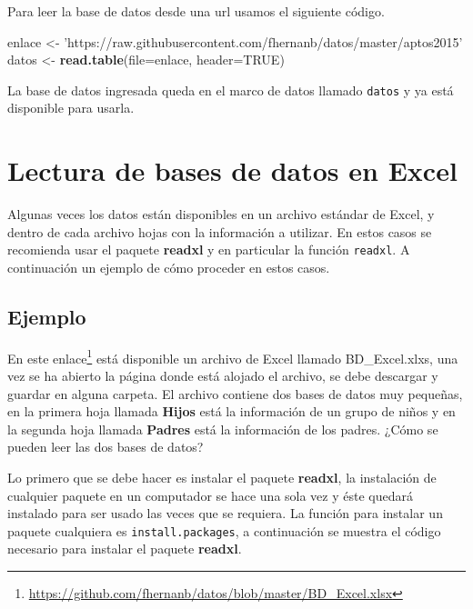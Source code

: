 \documentclass[10pt,]{krantz}
\makeatletter
\newenvironment{Shaded}{\begin{snugshade}}{\end{snugshade}}
\newcommand{\KeywordTok}[1]{\textcolor[rgb]{0.13,0.29,0.53}{\textbf{{#1}}}}
\newcommand{\DataTypeTok}[1]{\textcolor[rgb]{0.13,0.29,0.53}{{#1}}}
\newcommand{\StringTok}[1]{\textcolor[rgb]{0.31,0.60,0.02}{{#1}}}
\newcommand{\OtherTok}[1]{\textcolor[rgb]{0.56,0.35,0.01}{{#1}}}
\newcommand{\NormalTok}[1]{{#1}}
\renewcommand{\href}[2]{#2\footnote{\url{#1}}}
\newenvironment{kframe}{%
\medskip{}
\setlength{\fboxsep}{.8em}
 \def\at@end@of@kframe{}%
 \ifinner\ifhmode%
  \def\at@end@of@kframe{\end{minipage}}%
  \begin{minipage}{\columnwidth}%
 \fi\fi%
 \def\FrameCommand##1{\hskip\@totalleftmargin \hskip-\fboxsep
 \colorbox{shadecolor}{##1}\hskip-\fboxsep
     \hskip-\linewidth \hskip-\@totalleftmargin \hskip\columnwidth}%
 \MakeFramed {\advance\hsize-\width
   \@totalleftmargin\z@ \linewidth\hsize
   \@setminipage}}%
 {\par\unskip\endMakeFramed%
 \at@end@of@kframe}
\renewenvironment{Shaded}{\begin{kframe}}{\end{kframe}}
\makeatother
\begin{document}
Para leer la base de datos desde una url usamos el siguiente código.

\begin{Shaded}
\begin{Highlighting}[]
\NormalTok{enlace <-}\StringTok{ 'https://raw.githubusercontent.com/fhernanb/datos/master/aptos2015'}
\NormalTok{datos <-}\StringTok{ }\KeywordTok{read.table}\NormalTok{(}\DataTypeTok{file=}\NormalTok{enlace, }\DataTypeTok{header=}\OtherTok{TRUE}\NormalTok{)}
\end{Highlighting}
\end{Shaded}

La base de datos ingresada queda en el marco de datos llamado
\texttt{datos} y ya está disponible para usarla.

\section{Lectura de bases de datos en
Excel}\label{lectura-de-bases-de-datos-en-excel}

Algunas veces los datos están disponibles en un archivo estándar de
Excel, y dentro de cada archivo hojas con la información a utilizar. En
estos casos se recomienda usar el paquete \textbf{readxl}
\citep{R-readxl} y en particular la función \texttt{readxl}. A
continuación un ejemplo de cómo proceder en estos casos.

\subsection*{Ejemplo}\label{ejemplo-26}


En este
\href{https://github.com/fhernanb/datos/blob/master/BD_Excel.xlsx}{enlace}
está disponible un archivo de Excel llamado BD\_Excel.xlxs, una vez se
ha abierto la página donde está alojado el archivo, se debe descargar y
guardar en alguna carpeta. El archivo contiene dos bases de datos muy
pequeñas, en la primera hoja llamada \textbf{Hijos} está la información
de un grupo de niños y en la segunda hoja llamada \textbf{Padres} está
la información de los padres. ¿Cómo se pueden leer las dos bases de
datos?

Lo primero que se debe hacer es instalar el paquete \textbf{readxl}, la
instalación de cualquier paquete en un computador se hace una sola vez y
éste quedará instalado para ser usado las veces que se requiera. La
función para instalar un paquete cualquiera es
\texttt{install.packages}, a continuación se muestra el código necesario
para instalar el paquete \textbf{readxl}.
\end{document}
